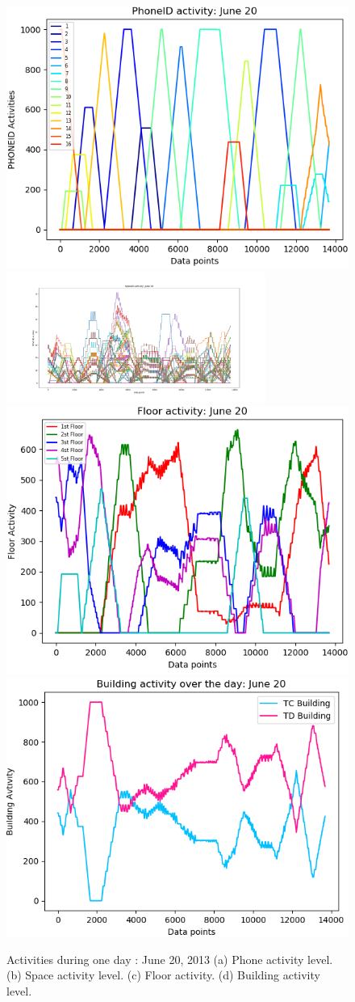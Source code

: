 \begin{figure}
    \centering
        \includegraphics[width = 7 cm]{image/Chapters/Chapter6/phoneTimejune20png.png}\hfill
        \includegraphics[width = 8 cm, height =160]{image/Chapters/Chapter6/spaceidAccumulatjune20.png}\hfill
        \includegraphics[width = 7 cm]{image/Chapters/Chapter6/floorTimejune20.png}\hfill
        \includegraphics[width = 7 cm]{image/Chapters/Chapter6/buildingTimejun6.png}
    \caption{Activities during one day : June 20, 2013 (a) Phone activity level. (b) Space activity level. (c) Floor activity. (d) Building activity level.}
    \label{static}
\end{figure}





